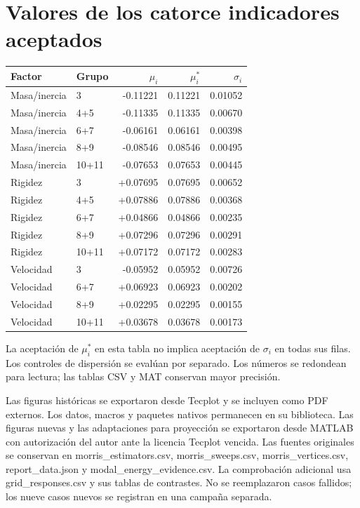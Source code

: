 \documentclass[11pt,a4paper]{article}
\begin{document}
\section{Valores de los catorce indicadores aceptados}
\begin{center}\small
\begin{tabular}{llrrr}
\toprule Factor & Grupo & $\mu_i$ & $\mu_i^*$ & $\sigma_i$ \\ \midrule
Masa/inercia & 3 & -0.11221 & 0.11221 & 0.01052 \\
Masa/inercia & 4+5 & -0.11335 & 0.11335 & 0.00670 \\
Masa/inercia & 6+7 & -0.06161 & 0.06161 & 0.00398 \\
Masa/inercia & 8+9 & -0.08546 & 0.08546 & 0.00495 \\
Masa/inercia & 10+11 & -0.07653 & 0.07653 & 0.00445 \\
Rigidez & 3 & +0.07695 & 0.07695 & 0.00652 \\
Rigidez & 4+5 & +0.07886 & 0.07886 & 0.00368 \\
Rigidez & 6+7 & +0.04866 & 0.04866 & 0.00235 \\
Rigidez & 8+9 & +0.07296 & 0.07296 & 0.00291 \\
Rigidez & 10+11 & +0.07172 & 0.07172 & 0.00283 \\
Velocidad & 3 & -0.05952 & 0.05952 & 0.00726 \\
Velocidad & 6+7 & +0.06923 & 0.06923 & 0.00202 \\
Velocidad & 8+9 & +0.02295 & 0.02295 & 0.00155 \\
Velocidad & 10+11 & +0.03678 & 0.03678 & 0.00173 \\

\bottomrule
\end{tabular}
\end{center}
La aceptación de $\mu_i^*$ en esta tabla no implica aceptación de $\sigma_i$ en todas sus filas. Los controles de dispersión se evalúan por separado. Los números se redondean para lectura; las tablas CSV y MAT conservan mayor precisión.

Las figuras históricas se exportaron desde Tecplot y se incluyen como PDF externos. Los datos, macros y paquetes nativos permanecen en su biblioteca. Las figuras nuevas y las adaptaciones para proyección se exportaron desde MATLAB con autorización del autor ante la licencia Tecplot vencida. Las fuentes originales se conservan en morris\_estimators.csv, morris\_sweeps.csv, morris\_vertices.csv, report\_data.json y modal\_energy\_evidence.csv. La comprobación adicional usa grid\_responses.csv y sus tablas de contrastes. No se reemplazaron casos fallidos; los nueve casos nuevos se registran en una campaña separada.
\end{document}
